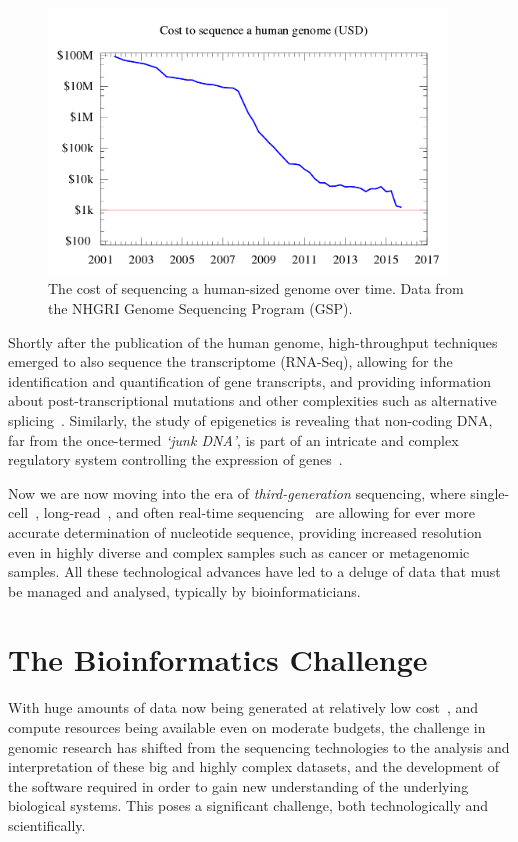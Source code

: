 \begin{justify}
\begin{figure}[h!]
    \centering
    \includegraphics[width=300pt]{chapters/images/Historic_cost_of_sequencing_a_human_genome.png}
    \caption{The cost of sequencing a human-sized genome over time. Data from the NHGRI Genome Sequencing Program (GSP).}\label{fig:seqcost}
\end{figure}

Shortly after the publication of the human genome, high-throughput techniques emerged to also sequence the transcriptome (RNA-Seq), allowing for the identification and quantification of gene transcripts, and providing information about post-transcriptional mutations and other complexities such as alternative splicing~\cite{wang2009rna}. Similarly, the study of epigenetics is revealing that non-coding DNA, far from the once-termed \textit{`junk DNA'}, is part of an intricate and complex regulatory system controlling the expression of genes~\cite{zuckerkandl2007combinatorial}.

Now we are now moving into the era of \emph{third-generation} sequencing, where single-cell~\cite{gawad2016single}, long-read~\cite{koren2015one}, and often real-time sequencing~\cite{flusberg2010direct} are allowing for ever more accurate determination of nucleotide sequence, providing increased resolution even in highly diverse and complex samples such as cancer or metagenomic samples. All these technological advances have led to a deluge of data that must be managed and analysed, typically by bioinformaticians.


\section{The Bioinformatics Challenge}

With huge amounts of data now being generated at relatively low cost~\cite{chen2014big}, and compute resources being available even on moderate budgets, the challenge in genomic research has shifted from the sequencing technologies to the analysis and interpretation of these big and highly complex datasets, and the development of the software required in order to gain new understanding of the underlying biological systems. This poses a significant challenge, both technologically and scientifically.



\end{justify}
